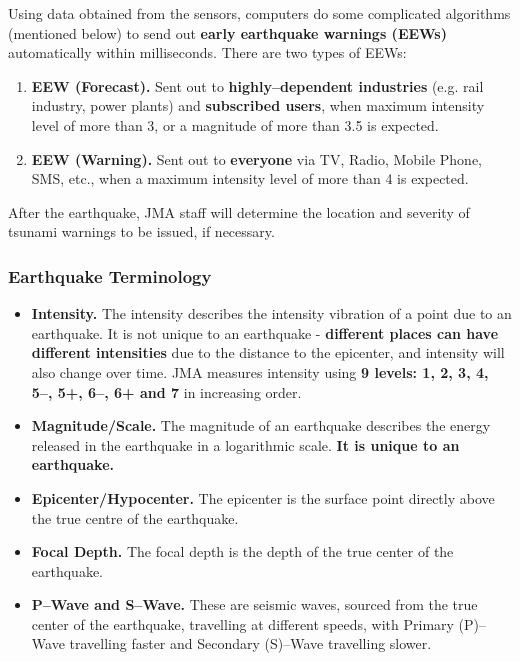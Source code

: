 \documentclass{article}
\begin{document}
Using data obtained from the sensors, computers do some complicated algorithms (mentioned below) to send out \textbf{early earthquake warnings (EEWs)} automatically within milliseconds. There are two types of EEWs:
\begin{enumerate}
    \item \textbf{EEW (Forecast).} Sent out to \textbf{highly--dependent industries} (e.g. rail industry, power plants) and \textbf{subscribed users}, when maximum intensity level of more than 3, or a magnitude of more than 3.5 is expected.
    \item \textbf{EEW (Warning).} Sent out to \textbf{everyone} via TV, Radio, Mobile Phone, SMS, etc., when a maximum intensity level of more than 4 is expected.
\end{enumerate}

After the earthquake, JMA staff will determine the location and severity of tsunami warnings to be issued, if necessary.

\subsubsection{Earthquake Terminology}

\begin{itemize}
    \item \textbf{Intensity.} The intensity describes the intensity vibration of a point due to an earthquake. It is not unique to an earthquake - \textbf{different places can have different intensities} due to the distance to the epicenter, and intensity will also change over time. JMA measures intensity using \textbf{9 levels: 1, 2, 3, 4, 5--, 5+, 6--, 6+ and 7} in increasing order.
    \item \textbf{Magnitude/Scale.} The magnitude of an earthquake describes the energy released in the earthquake in a logarithmic scale. \textbf{It is unique to an earthquake.}
    \item \textbf{Epicenter/Hypocenter.} The epicenter is the surface point directly above the true centre of the earthquake.
    \item \textbf{Focal Depth.} The focal depth is the depth of the true center of the earthquake.
    \item \textbf{P--Wave and S--Wave.} These are seismic waves, sourced from the true center of the earthquake, travelling at different speeds, with Primary (P)--Wave travelling faster and Secondary (S)--Wave travelling slower.
\end{itemize}
\end{document}
